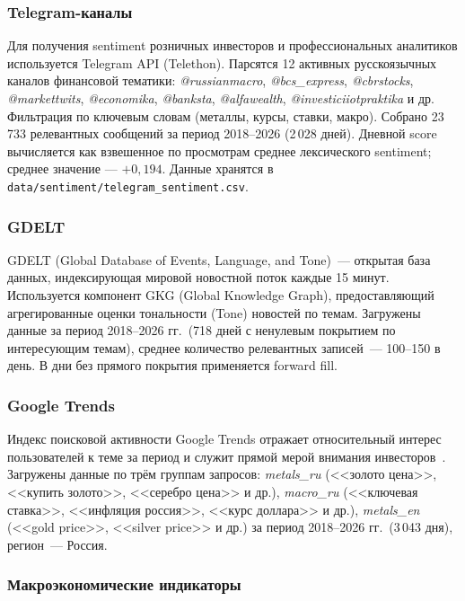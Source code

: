 \subsubsection{Telegram-каналы}

Для получения sentiment розничных инвесторов и профессиональных аналитиков
используется Telegram API (Telethon).
Парсятся 12 активных русскоязычных каналов финансовой тематики:
\textit{@russianmacro}, \textit{@bcs\_express}, \textit{@cbrstocks},
\textit{@markettwits}, \textit{@economika}, \textit{@banksta},
\textit{@alfawealth}, \textit{@investiciiotpraktika} и др.
Фильтрация по ключевым словам (металлы, курсы, ставки, макро).
Собрано 23\,733 релевантных сообщений за период 2018--2026 (2\,028 дней).
Дневной score вычисляется как взвешенное по просмотрам среднее
лексического sentiment; среднее значение --- $+0{,}194$.
Данные хранятся в \texttt{data/sentiment/telegram\_sentiment.csv}.

\subsubsection{GDELT}

GDELT (Global Database of Events, Language, and Tone)~--- открытая база данных,
индексирующая мировой новостной поток каждые 15 минут.
Используется компонент GKG (Global Knowledge Graph),
предоставляющий агрегированные оценки тональности (Tone) новостей по темам.
Загружены данные за период 2018--2026 гг.\ (718 дней с ненулевым покрытием
по интересующим темам), среднее количество релевантных записей~--- 100--150 в день.
В дни без прямого покрытия применяется forward fill.

\subsubsection{Google Trends}

Индекс поисковой активности Google Trends отражает относительный интерес
пользователей к теме за период и служит прямой мерой внимания инвесторов~\cite{Da2011}.
Загружены данные по трём группам запросов:
\textit{metals\_ru} (<<золото цена>>, <<купить золото>>, <<серебро цена>> и др.),
\textit{macro\_ru} (<<ключевая ставка>>, <<инфляция россия>>, <<курс доллара>> и др.),
\textit{metals\_en} (<<gold price>>, <<silver price>> и др.)
за период 2018--2026 гг.\ (3\,043 дня), регион~--- Россия.

\subsubsection{Макроэкономические индикаторы}

